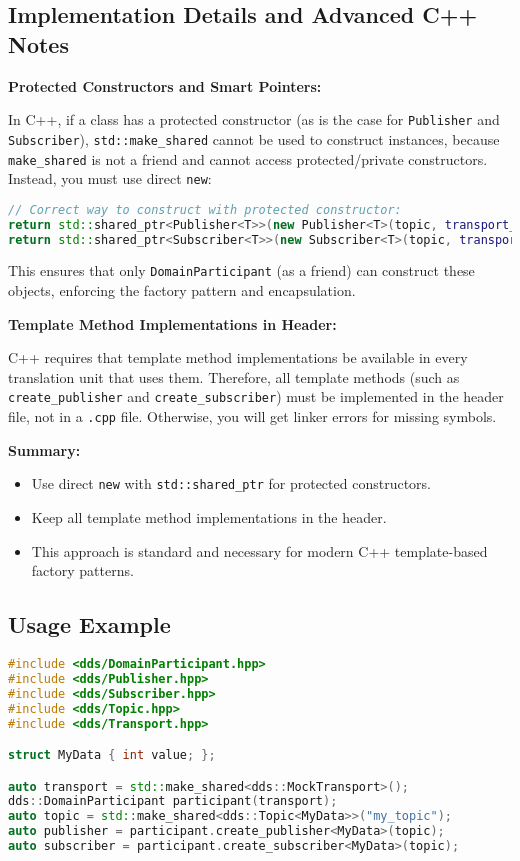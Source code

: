 \documentclass[12pt]{report}
\begin{document}
\subsection{Implementation Details and Advanced C++ Notes}
\textbf{Protected Constructors and Smart Pointers:}

In C++, if a class has a protected constructor (as is the case for \texttt{Publisher} and \texttt{Subscriber}), \texttt{std::make_shared} cannot be used to construct instances, because \texttt{make_shared} is not a friend and cannot access protected/private constructors. Instead, you must use direct \texttt{new}:
\begin{lstlisting}[language=C++]
// Correct way to construct with protected constructor:
return std::shared_ptr<Publisher<T>>(new Publisher<T>(topic, transport_));
return std::shared_ptr<Subscriber<T>>(new Subscriber<T>(topic, transport_));
\end{lstlisting}
This ensures that only \texttt{DomainParticipant} (as a friend) can construct these objects, enforcing the factory pattern and encapsulation.

\textbf{Template Method Implementations in Header:}

C++ requires that template method implementations be available in every translation unit that uses them. Therefore, all template methods (such as \texttt{create\_publisher} and \texttt{create\_subscriber}) must be implemented in the header file, not in a \texttt{.cpp} file. Otherwise, you will get linker errors for missing symbols.

\textbf{Summary:}
\begin{itemize}
    \item Use direct \texttt{new} with \texttt{std::shared_ptr} for protected constructors.
    \item Keep all template method implementations in the header.
    \item This approach is standard and necessary for modern C++ template-based factory patterns.
\end{itemize}

\subsection{Usage Example}
\begin{lstlisting}[language=C++]
#include <dds/DomainParticipant.hpp>
#include <dds/Publisher.hpp>
#include <dds/Subscriber.hpp>
#include <dds/Topic.hpp>
#include <dds/Transport.hpp>

struct MyData { int value; };

auto transport = std::make_shared<dds::MockTransport>();
dds::DomainParticipant participant(transport);
auto topic = std::make_shared<dds::Topic<MyData>>("my_topic");
auto publisher = participant.create_publisher<MyData>(topic);
auto subscriber = participant.create_subscriber<MyData>(topic);
\end{lstlisting}
\end{document}
